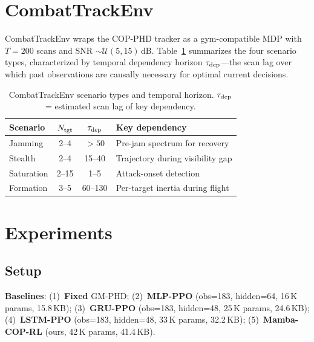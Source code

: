 \documentclass[journal]{IEEEtran}
\begin{document}
\section{CombatTrackEnv}
\label{sec:env}

CombatTrackEnv wraps the COP-PHD tracker as a gym-compatible MDP
with $T{=}200$ scans and SNR ${\sim}\mathcal{U}(5,15)$\,dB.
Table~\ref{tab:scenarios} summarizes the four scenario types,
characterized by temporal dependency horizon $\tau_{\rm dep}$---the
scan lag over which past observations are causally necessary for
optimal current decisions.

\begin{table}[t]
  \centering
  \caption{CombatTrackEnv scenario types and temporal horizon.
           $\tau_{\rm dep}$ = estimated scan lag of key dependency.}
  \label{tab:scenarios}
  \setlength{\tabcolsep}{4pt}
  \begin{tabular}{lccp{3.5cm}}
    \toprule
    Scenario & $N_{\rm tgt}$ & $\tau_{\rm dep}$ & Key dependency \\
    \midrule
    Jamming    & 2--4  & $>50$   & Pre-jam spectrum for recovery \\
    Stealth    & 2--4  & 15--40  & Trajectory during visibility gap \\
    Saturation & 2--15 & 1--5    & Attack-onset detection \\
    Formation  & 3--5  & 60--130 & Per-target inertia during flight \\
    \bottomrule
  \end{tabular}
\end{table}



\section{Experiments}
\label{sec:experiments}

\subsection{Setup}

\textbf{Baselines}:
(1)~\textbf{Fixed} GM-PHD;
(2)~\textbf{MLP-PPO} (obs=183, hidden=64, 16\,K params, 15.8\,KB);
(3)~\textbf{GRU-PPO} (obs=183, hidden=48, 25\,K params, 24.6\,KB);
(4)~\textbf{LSTM-PPO} (obs=183, hidden=48, 33\,K params, 32.2\,KB);
(5)~\textbf{Mamba-COP-RL} (ours, 42\,K params, 41.4\,KB).
\end{document}
